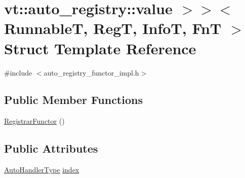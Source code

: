 \hypertarget{structvt_1_1auto__registry_1_1_registrar_functor_3_01_runnable_t_00_01_reg_t_00_01_info_t_00_01_4e1b66c1fb5f9a7f528e44d26c164c07}{}\section{vt\+:\+:auto\+\_\+registry\+:\+:value $>$$>$$<$ RunnableT, RegT, InfoT, FnT $>$ Struct Template Reference}
\label{structvt_1_1auto__registry_1_1_registrar_functor_3_01_runnable_t_00_01_reg_t_00_01_info_t_00_01_4e1b66c1fb5f9a7f528e44d26c164c07}


{\ttfamily \#include $<$auto\+\_\+registry\+\_\+functor\+\_\+impl.\+h$>$}

\subsection*{Public Member Functions}
\begin{DoxyCompactItemize}
\item 
\hyperlink{structvt_1_1auto__registry_1_1_registrar_functor_3_01_runnable_t_00_01_reg_t_00_01_info_t_00_01_4e1b66c1fb5f9a7f528e44d26c164c07_acb5b94751607c69f2a8a9eecf1c1706c}{Registrar\+Functor} ()
\end{DoxyCompactItemize}
\subsection*{Public Attributes}
\begin{DoxyCompactItemize}
\item 
\hyperlink{namespacevt_1_1auto__registry_ae295e18699146815bb7d7674594d95d7}{Auto\+Handler\+Type} \hyperlink{structvt_1_1auto__registry_1_1_registrar_functor_3_01_runnable_t_00_01_reg_t_00_01_info_t_00_01_4e1b66c1fb5f9a7f528e44d26c164c07_ab57e90a096ad7a4800ab26e5da4249bb}{index}
\end{DoxyCompactItemize}


